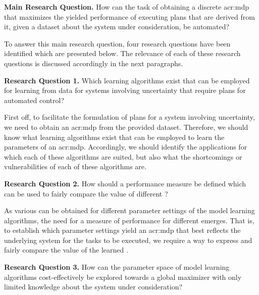 \vspace{12pt}
\noindent%
\textbf{Main Research Question.} How can the task of obtaining a discrete \acrfull{acr:mdp} that maximizes the yielded performance of executing plans that are derived from it, given a dataset about the system under consideration, be automated?
\vspace{12pt}

To answer this main research question, four research questions have been identified which are presented below.
The relevance of each of these research questions is discussed accordingly in the next paragraphs.

\vspace{16pt}
\noindent%
\textbf{Research Question 1.} Which learning algorithms exist that can be employed for learning  from data for systems involving uncertainty that require plans for automated control?
\vspace{0pt}

First off, to facilitate the formulation of plans for a system involving uncertainty, we need to obtain an \acrshort{acr:mdp} from the provided dataset.
Therefore, we should know what learning algorithms exist that can be employed to learn the parameters of an \acrshort{acr:mdp}.
Accordingly, we should identify the applications for which each of these algorithms are suited, but also what the shortcomings or vulnerabilities of each of these algorithms are.

\vspace{16pt}
\noindent%
\textbf{Research Question 2.} How should a performance measure be defined which can be used to fairly compare the value of different ?
\vspace{12pt}

As various  can be obtained for different parameter settings of the model learning algorithms, the need for a measure of performance for different  emerges.
That is, to establish which parameter settings yield an \acrshort{acr:mdp} that best reflects the underlying system for the tasks to be executed, we require a way to express and fairly compare the value of the learned .

\vspace{16pt}
\noindent%
\textbf{Research Question 3.} How can the parameter space of model learning algorithms cost-effectively be explored towards a global maximizer with only limited knowledge about the system under consideration?
\vspace{12pt}

